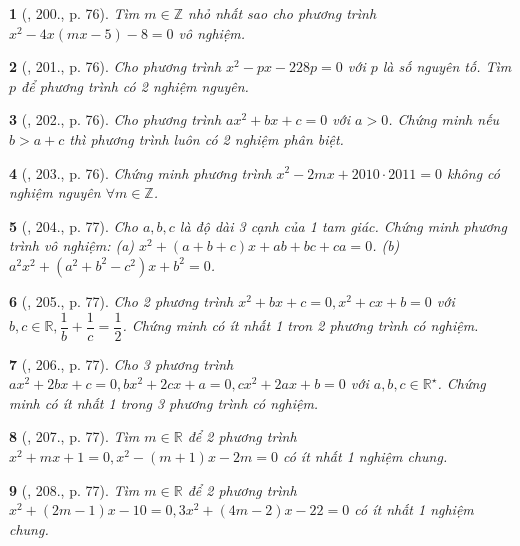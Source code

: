 \documentclass{article}
\newtheorem{baitoan}{}
\begin{document}
\begin{baitoan}[\cite{Tuyen_Toan_9_old}, 200., p. 76]
	Tìm $m\in\mathbb{Z}$ nhỏ nhất sao cho phương trình $x^2 - 4x(mx - 5) - 8 = 0$ vô nghiệm.
\end{baitoan}

\begin{baitoan}[\cite{Tuyen_Toan_9_old}, 201., p. 76]
	Cho phương trình $x^2 - px - 228p = 0$ với $p$ là số nguyên tố. Tìm $p$ để phương trình có 2 nghiệm nguyên.
\end{baitoan}

\begin{baitoan}[\cite{Tuyen_Toan_9_old}, 202., p. 76]
	Cho phương trình $ax^2 + bx + c = 0$ với $a > 0$. Chứng minh nếu $b > a + c$ thì phương trình luôn có 2 nghiệm phân biệt.
\end{baitoan}

\begin{baitoan}[\cite{Tuyen_Toan_9_old}, 203., p. 76]
	Chứng minh phương trình $x^2 - 2mx + 2010\cdot2011 = 0$ không có nghiệm nguyên $\forall m\in\mathbb{Z}$.
\end{baitoan}

\begin{baitoan}[\cite{Tuyen_Toan_9_old}, 204., p. 77]
	Cho $a,b,c$ là độ dài 3 cạnh của 1 tam giác. Chứng minh phương trình vô nghiệm: (a) $x^2 + (a + b + c)x + ab + bc + ca = 0$. (b) $a^2x^2 + (a^2 + b^2 - c^2)x + b^2 = 0$.
\end{baitoan}

\begin{baitoan}[\cite{Tuyen_Toan_9_old}, 205., p. 77]
	Cho 2 phương trình $x^2 + bx + c = 0,x^2 + cx + b = 0$ với $b,c\in\mathbb{R},\dfrac{1}{b} + \dfrac{1}{c} = \dfrac{1}{2}$. Chứng minh có ít nhất 1 tron 2 phương trình có nghiệm.
\end{baitoan}

\begin{baitoan}[\cite{Tuyen_Toan_9_old}, 206., p. 77]
	Cho 3 phương trình $ax^2 + 2bx + c = 0,bx^2 + 2cx + a = 0,cx^2 + 2ax + b = 0$ với $a,b,c\in\mathbb{R}^\star$. Chứng minh có ít nhất 1 trong 3 phương trình có nghiệm.
\end{baitoan}

\begin{baitoan}[\cite{Tuyen_Toan_9_old}, 207., p. 77]
	Tìm $m\in\mathbb{R}$ để 2 phương trình $x^2 + mx + 1 = 0,x^2 - (m + 1)x - 2m = 0$ có ít nhất 1 nghiệm chung.
\end{baitoan}

\begin{baitoan}[\cite{Tuyen_Toan_9_old}, 208., p. 77]
	Tìm $m\in\mathbb{R}$ để 2 phương trình $x^2 + (2m - 1)x - 10 = 0,3x^2 + (4m - 2)x - 22 = 0$ có ít nhất 1 nghiệm chung.
\end{baitoan}
\end{document}
